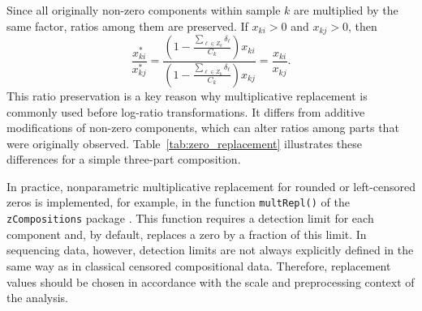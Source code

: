 Since all originally non-zero components within sample $k$ are multiplied by the same factor, ratios among them are preserved. If $x_{ki}>0$ and $x_{kj}>0$, then
\begin{equation}
\frac{x_{ki}^\ast}{x_{kj}^\ast}
=
\frac{\left(1-\frac{\sum_{\ell\in Z_k}\delta_\ell}{C_k}\right)x_{ki}}
{\left(1-\frac{\sum_{\ell\in Z_k}\delta_\ell}{C_k}\right)x_{kj}}
=
\frac{x_{ki}}{x_{kj}}.
\label{eq:2micro:multiplicative_replacement_ratio}
\end{equation}
This ratio preservation is a key reason why multiplicative replacement is commonly used before log-ratio transformations. It differs from additive modifications of non-zero components, which can alter ratios among parts that were originally observed. Table~\ref{tab:zero_replacement} illustrates these differences for a simple three-part composition.

In practice, nonparametric multiplicative replacement for rounded or left-censored zeros is implemented, for example, in the function \texttt{multRepl()} of the \texttt{zCompositions} package \citep{palarea-albaladejo2015zcompositions}. This function requires a detection limit for each component and, by default, replaces a zero by a fraction of this limit. In sequencing data, however, detection limits are not always explicitly defined in the same way as in classical censored compositional data. Therefore, replacement values should be chosen in accordance with the scale and preprocessing context of the analysis.

